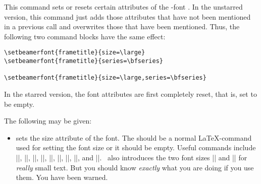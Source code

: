 \begin{command}{\setbeamerfont\opt{|*|}}
  This command sets or resets certain attributes of the \beamer-font
  . In the unstarred version, this command just
  adds those attributes that have not been mentioned in a previous
  call and overwrites those that have been mentioned. Thus, the
  following two command blocks have the same effect:

  \example
\begin{verbatim}
\setbeamerfont{frametitle}{size=\large}
\setbeamerfont{frametitle}{series=\bfseries}

\setbeamerfont{frametitle}{size=\large,series=\bfseries}
\end{verbatim}

  In the starred version, the font attributes are first completely
  reset, that is, set to be empty.

  The following  may be given:
  \begin{itemize}
  \item {} sets the size
    attribute of the \beamer font. The  should be a
    normal \LaTeX-command used for setting the font size or it should
    be empty. Useful commands include |\tiny|, |\scriptsize|,
    |\footnotesize|, |\small|, |\normalsize|, |\large|, |\Large|,
    |\huge|, and |\Huge|. \beamer\ also introduces the two font sizes
    |\Tiny| and |\TINY| for \emph{really} small text. But you should
    know \emph{exactly} what you are doing if you use them. You have
    been warned.


\end{itemize}
\end{command}
